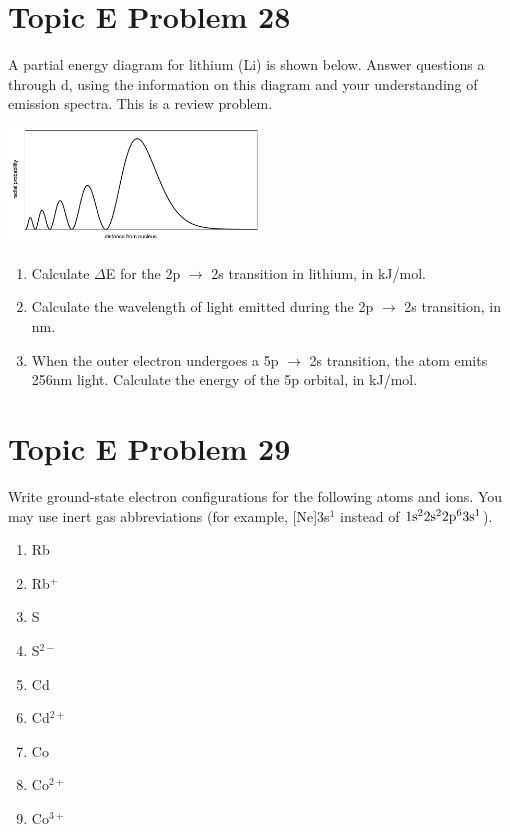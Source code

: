 \documentclass[10pt]{article}
\begin{document}
    \pagebreak
    \section{Topic E Problem 28}
        A partial energy diagram for lithium (Li) is shown below. 
        Answer questions a through d, using the information on this diagram and your understanding of emission spectra. 
        This is a review problem.
        \begin{center}
            \includegraphics[width=0.5\textwidth]{img-E26.png}
        \end{center}

        \begin{enumerate}
            \item   Calculate $\Delta$E for the 2p $\rightarrow$ 2s transition in lithium, in kJ/mol.
            \item   Calculate the wavelength of light emitted during the 2p $\rightarrow$ 2s transition, in nm.
            \item   When the outer electron undergoes a 5p $\rightarrow$ 2s transition, the atom emits 256nm light. Calculate the energy of the 5p orbital, in kJ/mol.
        \end{enumerate}

    \pagebreak
    \section{Topic E Problem 29}
        Write ground-state electron configurations for the following atoms and ions. 
        You may use inert gas abbreviations (for example, [Ne]3s$^1$ instead of $\rm 1s^2 2s^2 2p^6 3s^1$).
        \begin{multicols}{3}
            \begin{enumerate}
                \item   Rb
                \item   Rb$^+$
                \item   S
                \item   S$^{2-}$
                \item   Cd
                \item   Cd$^{2+}$
                \item   Co
                \item   Co$^{2+}$
                \item   Co$^{3+}$
            \end{enumerate}
        \end{multicols}
\end{document}
